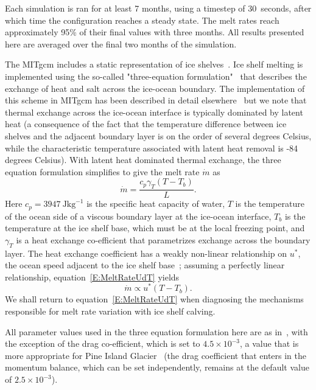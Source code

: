 \documentclass[draft]{agujournal2019}
\begin{document}
Each simulation is ran for at least 7 months, using a timestep of 30~\si{seconds}, after which time the configuration reaches a steady state. The melt rates reach approximately 95\% of their final values with three months. All results presented here are averaged over the final two months of the simulation. 

The MITgcm includes a static representation of ice shelves~\cite{Losch2008JGeophysResOceans}. Ice shelf melting is implemented using the so-called "three-equation formulation"~\cite{Holland1999JPhysOcean} that describes the exchange of heat and salt across the ice-ocean boundary. The implementation of this scheme in MITgcm has been described in detail elsewhere~\cite[for example]{DeRydt2014JGeophysResOceans,Dansereau2014JGROceans} but we note that thermal exchange across the ice-ocean interface is typically dominated by latent heat (a consequence of the fact that the temperature difference between ice shelves and the adjacent boundary layer is on the order of several degrees Celsius, while the characteristic temperature associated with latent heat removal is -84 degrees Celsius). With latent heat dominated thermal exchange, the three equation formulation simplifies to give the melt rate $\dot{m}$ as
\begin{equation}\label{E:MeltRate}
    \dot{m} = \frac{c_p \gamma_T (T - T_b)}{L}.
\end{equation}
Here $c_p = 3947~\si{\joule \kilogram}^{-1}$ is the specific heat capacity of water, $T$ is the temperature of the ocean side of a viscous boundary layer at the ice-ocean interface, $T_b$ is the temperature at the ice shelf base, which must be at the local freezing point, and $\gamma_T$ is a heat exchange co-efficient that parametrizes exchange across the boundary layer. The heat exchange coefficient has a weakly non-linear relationship on $u^*$, the ocean speed adjacent to the ice shelf base~\cite{Holland1999JPhysOcean}; assuming a perfectly linear relationship, equation~\eqref{E:MeltRateUdT} yields
\begin{equation}\label{E:MeltRateUdT}
    \dot{m} \propto u^* (T - T_b).
\end{equation}
We shall return to equation~\eqref{E:MeltRateUdT} when diagnosing the mechanisms responsible for melt rate variation with ice shelf calving.

All parameter values used in the three equation formulation here are as in~, with the exception of the drag co-efficient, which is set to $4.5\times10^{-3}$, a value that is more appropriate for Pine Island Glacier~\cite{Dutrieux2014Science} (the drag coefficient that enters in the momentum balance, which can be set independently, remains at the default value of $2.5\times 10^{-3}$).
\end{document}

